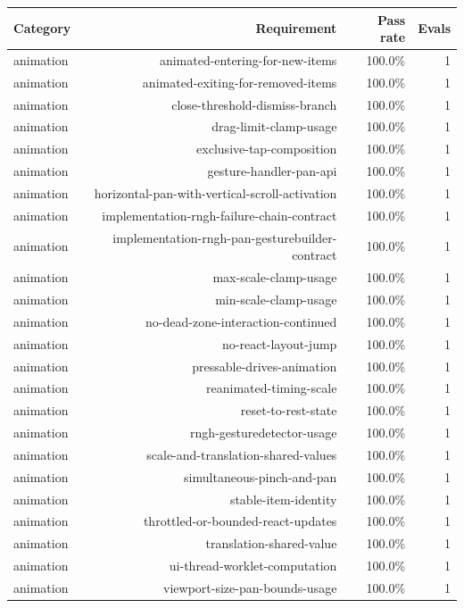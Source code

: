 \begin{table}[htbp]
\centering
\begin{tabular}{lrrr}
\toprule
Category & Requirement & Pass rate & Evals \\
\midrule
animation & animated-entering-for-new-items & 100.0\% & 1 \\
animation & animated-exiting-for-removed-items & 100.0\% & 1 \\
animation & close-threshold-dismiss-branch & 100.0\% & 1 \\
animation & drag-limit-clamp-usage & 100.0\% & 1 \\
animation & exclusive-tap-composition & 100.0\% & 1 \\
animation & gesture-handler-pan-api & 100.0\% & 1 \\
animation & horizontal-pan-with-vertical-scroll-activation & 100.0\% & 1 \\
animation & implementation-rngh-failure-chain-contract & 100.0\% & 1 \\
animation & implementation-rngh-pan-gesturebuilder-contract & 100.0\% & 1 \\
animation & max-scale-clamp-usage & 100.0\% & 1 \\
animation & min-scale-clamp-usage & 100.0\% & 1 \\
animation & no-dead-zone-interaction-continued & 100.0\% & 1 \\
animation & no-react-layout-jump & 100.0\% & 1 \\
animation & pressable-drives-animation & 100.0\% & 1 \\
animation & reanimated-timing-scale & 100.0\% & 1 \\
animation & reset-to-rest-state & 100.0\% & 1 \\
animation & rngh-gesturedetector-usage & 100.0\% & 1 \\
animation & scale-and-translation-shared-values & 100.0\% & 1 \\
animation & simultaneous-pinch-and-pan & 100.0\% & 1 \\
animation & stable-item-identity & 100.0\% & 1 \\
animation & throttled-or-bounded-react-updates & 100.0\% & 1 \\
animation & translation-shared-value & 100.0\% & 1 \\
animation & ui-thread-worklet-computation & 100.0\% & 1 \\
animation & viewport-size-pan-bounds-usage & 100.0\% & 1 \\

\end{tabular}
\end{table}
